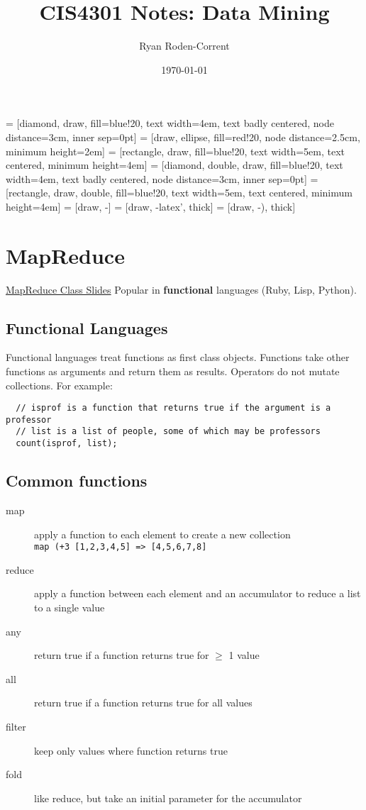 \documentclass[12pt]{article}
\title{CIS4301 Notes: Data Mining}
\author{Ryan Roden-Corrent}
\date{\today}
\begin{document}
\setlength\parindent{0pt}
 = [diamond, draw, fill=blue!20, text width=4em,
  text badly centered, node distance=3cm, inner sep=0pt]
 = [draw, ellipse, fill=red!20, node distance=2.5cm,
  minimum height=2em]
 = [rectangle, draw, fill=blue!20, text width=5em,
  text centered, minimum height=4em]
 = [diamond, double, draw, fill=blue!20, text width=4em,
  text badly centered, node distance=3cm, inner sep=0pt]
 = [rectangle, draw, double, fill=blue!20, text width=5em,
  text centered, minimum height=4em]
 = [draw, -]
 = [draw, -latex', thick]
 = [draw, -), thick]
\maketitle
\section{MapReduce}
\href{http://cise.ufl.edu/class/cis4301sp14/slides/map_reduce.pdf}
{MapReduce Class Slides}
Popular in \textbf{functional} languages (Ruby, Lisp, Python).
\subsection{Functional Languages}
Functional languages treat functions as first class objects. Functions take
other functions as arguments and return them as results. Operators do not
mutate collections.
For example:
\begin{lstlisting}
  // isprof is a function that returns true if the argument is a professor
  // list is a list of people, some of which may be professors
  count(isprof, list);
\end{lstlisting}

\subsection{Common functions}
\begin{description}
  \item [map] apply a function to each element to create a new collection\\
    \lstinline{map (+3 [1,2,3,4,5] => [4,5,6,7,8]}
  \item [reduce] apply a function between each element and an accumulator to
    reduce a list to a single value
  \item [any] return true if a function returns true for $\ge$ 1 value
  \item [all]return true if a function returns true for all values
  \item [filter] keep only values where function returns true
  \item [fold] like reduce, but take an initial parameter for the accumulator
\end{description}
\end{document}
